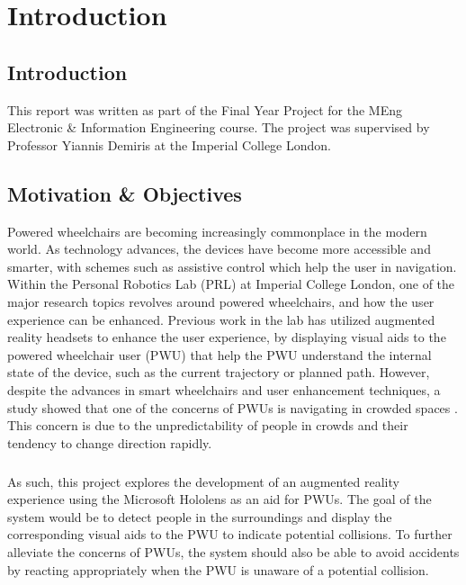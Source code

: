 \chapter{Introduction}

\section{Introduction}
This report was written as part of the Final Year Project for the MEng Electronic \& Information Engineering course. The project was supervised by Professor Yiannis Demiris at the Imperial College London.

\section{Motivation \& Objectives}
Powered wheelchairs are becoming increasingly commonplace in the modern world. As technology advances, the devices have become more accessible and smarter, with schemes such as assistive control which help the user in navigation. Within the Personal Robotics Lab (PRL) at Imperial College London, one of the major research topics revolves around powered wheelchairs, and how the user experience can be enhanced. Previous work in the lab has utilized augmented reality headsets to enhance the user experience, by displaying visual aids to the powered wheelchair user (PWU) \cite{Zolotas2018, Chacon-Quesada} that help the PWU understand the internal state of the device, such as the current trajectory or planned path. However, despite the advances in smart wheelchairs and user enhancement techniques, a study showed that one of the concerns of PWUs is navigating in crowded spaces \cite{Kairy2014}. This concern is due to the unpredictability of people in crowds and their tendency to change direction rapidly. 

\paragraph{}As such, this project explores the development of an augmented reality experience using the Microsoft Hololens as an aid for PWUs. The goal of the system would be to detect people in the surroundings and display the corresponding visual aids to the PWU to indicate potential collisions. To further alleviate the concerns of PWUs, the system should also be able to avoid accidents by reacting appropriately when the PWU is unaware of a potential collision.

